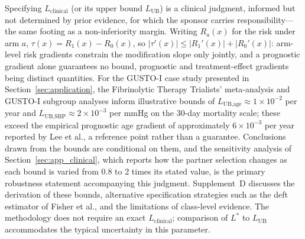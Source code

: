 \documentclass[AMA,Times1COL]{WileyNJDv5}
\begin{document}
Specifying $L_{\text{clinical}}$ (or its upper bound $L_{\text{UB}}$) is a clinical judgment, informed but not determined by prior evidence, for which the sponsor carries responsibility---the same footing as a non-inferiority margin. Writing $R_a(x)$ for the risk under arm $a$, $\tau(x) = R_1(x) - R_0(x)$, so $|\tau'(x)| \leq |R_1'(x)| + |R_0'(x)|$: arm-level risk gradients constrain the modification slope only jointly, and a prognostic gradient alone guarantees no bound, prognostic and treatment-effect gradients being distinct quantities.\cite{ballman2015,kent2020} For the GUSTO-I case study presented in Section~\ref{sec:application}, the Fibrinolytic Therapy Trialists' meta-analysis\cite{ftt1994} and GUSTO-I subgroup analyses\cite{gusto1993,lee1995} inform illustrative bounds of $L_{\text{UB,age}} \approx 1 \times 10^{-2}$ per year and $L_{\text{UB,SBP}} \approx 2 \times 10^{-3}$ per mmHg on the 30-day mortality scale; these exceed the empirical prognostic age gradient of approximately $6 \times 10^{-3}$ per year reported by Lee et al.,\cite{lee1995} a reference point rather than a guarantee. Conclusions drawn from the bounds are conditional on them, and the sensitivity analysis of Section~\ref{sec:app_clinical}, which reports how the partner selection changes as each bound is varied from 0.8 to 2 times its stated value, is the primary robustness statement accompanying this judgment. Supplement~D discusses the derivation of these bounds, alternative specification strategies such as the deft estimator of Fisher et al.,\cite{fisher2017} and the limitations of class-level evidence. The methodology does not require an exact $L_{\text{clinical}}$; comparison of $L^*$ to $L_{\text{UB}}$ accommodates the typical uncertainty in this parameter.
\end{document}
